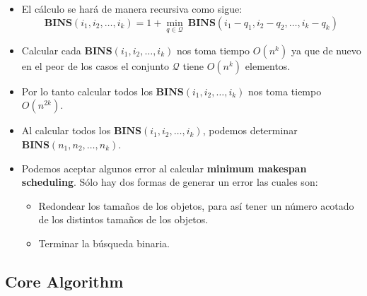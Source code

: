 \begin{frame}{\subsectiontitle}
    \begin{itemize}
        \item El cálculo se hará de manera recursiva como sigue:
        \[
            \mathbf{BINS}\left(i_{1}, i_{2}, \dotsc, i_{k}\right) = 1 + \min_{q \in \mathcal{Q}} \ \mathbf{BINS}\left(i_{1} - q_{1}, i_{2} - q_{2}, \dotsc, i_{k} - q_{k}\right)
        \]
        \item Calcular cada \(\mathbf{BINS}\left(i_{1}, i_{2}, \dotsc, i_{k}\right)\) nos toma tiempo \(O\left(n^{k}\right)\) ya que de nuevo en el peor de los casos el conjunto \(\mathcal{Q}\) tiene \(O\left(n^{k}\right)\) elementos.
        \item Por lo tanto calcular todos los \(\mathbf{BINS}\left(i_{1}, i_{2}, \dotsc, i_{k}\right)\) nos toma tiempo \(O\left(n^{2k}\right)\).
        \item Al calcular todos los \(\mathbf{BINS}\left(i_{1}, i_{2}, \dotsc, i_{k}\right)\), podemos determinar \(\mathbf{BINS}\left(n_{1}, n_{2}, \dotsc, n_{k}\right)\).
    \end{itemize}
\end{frame}

\begin{frame}{\subsectiontitle}
    \begin{itemize}
        \item Podemos aceptar algunos error al calcular \textbf{minimum makespan scheduling}. Sólo hay dos formas de generar un error las cuales son:
        \begin{itemize}
            \item Redondear los tamaños de los objetos, para así tener un número acotado de los distintos tamaños de los objetos.
            \item Terminar la búsqueda binaria.
        \end{itemize}
    \end{itemize}
\end{frame}

\renewcommand{\subsectiontitle}{Core Algorithm}
\subsection{\subsectiontitle}

